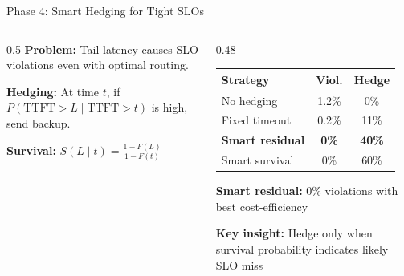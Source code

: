 \documentclass[aspectratio=169,10pt]{beamer}
\begin{document}
\begin{frame}{Phase 4: Smart Hedging for Tight SLOs}
\vspace{-0.3cm}
\begin{columns}[T]
\begin{column}{0.5\textwidth}
\scriptsize
\textbf{Problem:} Tail latency causes SLO violations even with optimal routing.

\vspace{0.1cm}
\textbf{Hedging:} At time $t$, if $P(\text{TTFT} > L \mid \text{TTFT} > t)$ is high, send backup.

\vspace{0.1cm}
\textbf{Survival:} $S(L \mid t) = \frac{1 - F(L)}{1 - F(t)}$

\vspace{0.15cm}
\centering
{}
\end{column}

\begin{column}{0.48\textwidth}
\scriptsize
\begin{tabular}{lcc}
\toprule
Strategy & Viol. & Hedge \\
\midrule
No hedging & 1.2\% & 0\% \\
Fixed timeout & 0.2\% & 11\% \\
\textbf{Smart residual} & \textbf{0\%} & \textbf{40\%} \\
Smart survival & 0\% & 60\% \\
\bottomrule
\end{tabular}

\vspace{0.2cm}
\footnotesize
\textbf{Smart residual:} 0\% violations with best cost-efficiency

\vspace{0.15cm}
\textbf{Key insight:} Hedge only when survival probability indicates likely SLO miss
\end{column}
\end{columns}
\end{frame}
\end{document}
